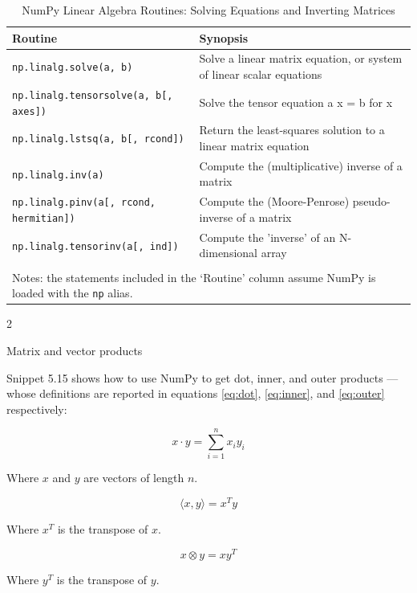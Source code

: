 \documentclass[a4paper,11pt]{book}
\newcommand{\question}[1]{%
    \begin{tcolorbox}[colback=comp_c!10,colframe=comp_c,sidebyside align=top,width=\linewidth,before skip=1ex]
        #1
    \end{tcolorbox}
    \switchcolumn%
}
\newcommand{\note}[1]{%
    \begin{tcolorbox}[colback=white!0,colframe=white!10,width=\linewidth,before skip=1ex]
        #1
    \end{tcolorbox}
}
\begin{document}
\begin{table}
	\centering
	\caption{NumPy Linear Algebra Routines: Solving Equations and Inverting Matrices} 
	\label{tab:solving_equations}
	\begin{tabular}{ll}
		\toprule \toprule
			Routine & Synopsis \\
			\midrule
                        \texttt{np.linalg.solve(a, b)} &
                        Solve a linear matrix equation, or system of linear scalar equations\\
                        \texttt{np.linalg.tensorsolve(a, b[, axes])} &
                        Solve the tensor equation a x = b for x\\
                        \texttt{np.linalg.lstsq(a, b[, rcond])} &
                        Return the least-squares solution to a linear matrix equation\\
                        \texttt{np.linalg.inv(a)} &
                        Compute the (multiplicative) inverse of a matrix\\
                        \texttt{np.linalg.pinv(a[, rcond, hermitian])} &
                        Compute the (Moore-Penrose) pseudo-inverse of a matrix\\
                        \texttt{np.linalg.tensorinv(a[, ind])} &
                        Compute the 'inverse' of an N-dimensional array\\
	     	\bottomrule \\[-1.8ex]
	        \multicolumn{2}{l}{Notes: the statements included in the `Routine' column assume NumPy is loaded with the \texttt{np} alias.} \\
	\end{tabular}
\end{table}
\clearpage

\begin{paracol}{2}
    \question{\raggedright Matrix and vector products}
    \note{Snippet 5.15 shows how to use NumPy to get dot, inner, and outer products --- whose definitions are reported in equations \ref{eq:dot}, \ref{eq:inner}, and \ref{eq:outer} respectively:
    
    \begin{equation}
	\label{eq:dot}
    	x \cdot y = \sum_{i=1}^n x_{i} y_{i} 
    \end{equation}

    Where $x$ and $y$ are vectors of length $n$. 

    \begin{equation}
	\label{eq:inner}
	\langle x, y\rangle = x^{T} y
    \end{equation}
    
    Where $x^{T}$ is the transpose of $x$. 
    
    \begin{equation}
	\label{eq:outer}
	x \otimes y = x y^{T}
    \end{equation}

    Where $y^{T}$ is the transpose of $y$.
    }
\end{paracol}
\end{document}
